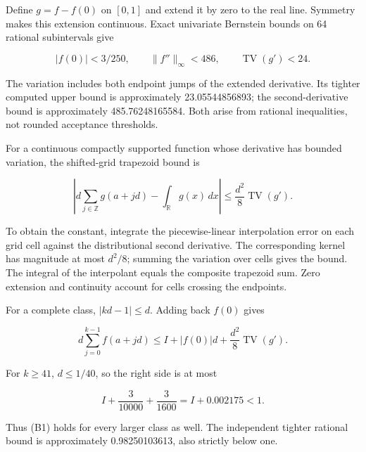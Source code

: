 \documentclass[11pt,a4paper]{article}
\begin{document}
\begin{samepage}

Define \(g=f-f(0)\) on \([0,1]\) and extend it by zero to the real line.
Symmetry makes this extension continuous. Exact univariate Bernstein
bounds on 64 rational subintervals give

\[|f(0)|<3/250,\qquad \|f''\|_\infty<486,
\qquad \operatorname{TV}(g')<24.\]

\end{samepage}

The variation includes both endpoint jumps of the extended derivative.
Its tighter computed upper bound is approximately 23.05544856893; the
second-derivative bound is approximately 485.76248165584. Both arise
from rational inequalities, not rounded acceptance thresholds.

\begin{samepage}

For a continuous compactly supported function whose derivative has
bounded variation, the shifted-grid trapezoid bound is

\[
\left|d\sum_{j\in\mathbb Z}g(a+jd)-\int_{\mathbb R}g(x)\,dx\right|
\le\frac{d^2}{8}\operatorname{TV}(g').
\]

\end{samepage}

To obtain the constant, integrate the piecewise-linear interpolation
error on each grid cell against the distributional second derivative.
The corresponding kernel has magnitude at most \(d^2/8\); summing the
variation over cells gives the bound. The integral of the interpolant
equals the composite trapezoid sum. Zero extension and continuity
account for cells crossing the endpoints.

\begin{samepage}

For a complete class, \(|kd-1|\le d\). Adding back \(f(0)\) gives

\[
d\sum_{j=0}^{k-1}f(a+jd)
\le I+|f(0)|d+\frac{d^2}{8}\operatorname{TV}(g').
\]

\end{samepage}

\begin{samepage}

For \(k\ge41\), \(d\le1/40\), so the right side is at most

\[I+\frac3{10000}+\frac3{1600}=I+0.002175<1.\]

\end{samepage}

Thus (B1) holds for every larger class as well. The independent tighter
rational bound is approximately 0.98250103613, also strictly below one.
\end{document}
